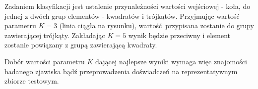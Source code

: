 Zadaniem klasyfikacji jest ustalenie przynależności wartości wejściowej - koła, do jednej z dwóch grup elementów - kwadratów i trójkątów. Przyjmując wartość parametru $K=3$ (linia ciągła na rysunku), wartość przypisana zostanie do grupy zawierającej trójkąty. Zakładając $K=5$ wynik będzie przeciwny i element zostanie powiązany z grupą zawierającą kwadraty.

Dobór wartości parametru $K$ dającej najlepsze wyniki wymaga więc znajomości badanego zjawiska bądź przeprowadzenia doświadczeń na reprezentatywnym zbiorze testowym.

